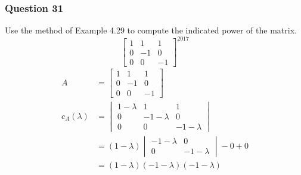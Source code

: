 \documentclass{math}
\begin{document}
\subsubsection*{Question 31}
Use the method of Example 4.29 to compute the indicated power of the matrix.
\[ \begin{bmatrix}
  1 & 1 & 1 \\
  0 & -1 & 0 \\
  0 & 0 & -1
\end{bmatrix}^{2017} \]
\begin{align*}
  A &= \begin{bmatrix}
    1 & 1 & 1 \\
    0 & -1 & 0 \\
    0 & 0 & -1
  \end{bmatrix} \\
  c_A(\lambda) &= \begin{vmatrix}
    1-\lambda & 1 & 1 \\
    0 & -1-\lambda & 0 \\
    0 & 0 & -1-\lambda
  \end{vmatrix} \\
  &= (1-\lambda)\begin{vmatrix}
    -1-\lambda & 0 \\
    0 & -1-\lambda
  \end{vmatrix}-0+0 \\
  &= (1-\lambda)(-1-\lambda)(-1-\lambda)
\end{align*}
\end{document}
